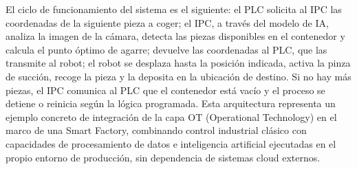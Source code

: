 
El ciclo de funcionamiento del sistema es el siguiente: el PLC solicita al IPC las coordenadas de la siguiente pieza a coger; el IPC, a través del modelo de IA, analiza la imagen de la cámara, detecta las piezas disponibles en el contenedor y calcula el punto óptimo de agarre; devuelve las coordenadas al PLC, que las transmite al robot; el robot se desplaza hasta la posición indicada, activa la pinza de succión, recoge la pieza y la deposita en la ubicación de destino. Si no hay más piezas, el IPC comunica al PLC que el contenedor está vacío y el proceso se detiene o reinicia según la lógica programada.
Esta arquitectura representa un ejemplo concreto de integración de la capa OT (Operational Technology) en el marco de una Smart Factory, combinando control industrial clásico con capacidades de procesamiento de datos e inteligencia artificial ejecutadas en el propio entorno de producción, sin dependencia de sistemas cloud externos.
